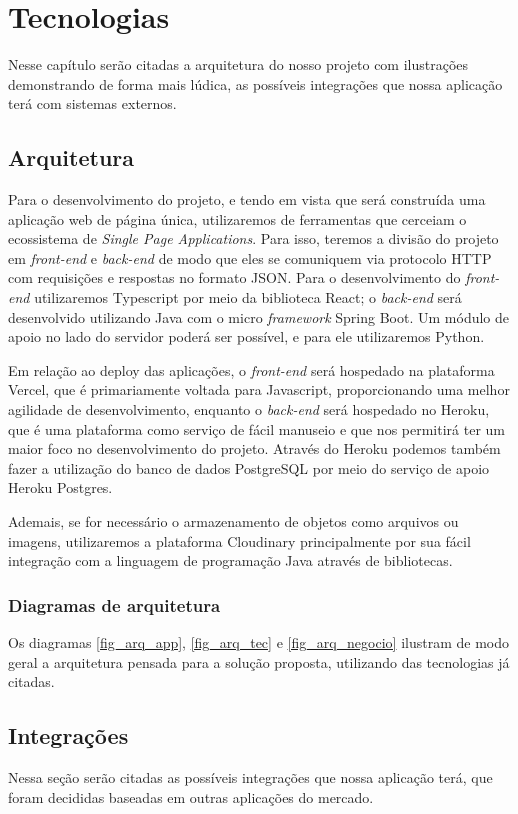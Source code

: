 \chapter{Tecnologias}
Nesse capítulo serão citadas a arquitetura do nosso projeto com ilustrações demonstrando de forma mais lúdica, as possíveis integrações que nossa aplicação terá com sistemas externos.

\section{Arquitetura}
Para o desenvolvimento do projeto, e tendo em vista que será construída uma aplicação web de página única, utilizaremos de ferramentas que cerceiam o ecossistema de \textit{Single Page Applications}. Para isso, teremos a divisão do projeto em \textit{front-end} e \textit{back-end} de modo que eles se comuniquem via protocolo HTTP com requisições e respostas no formato JSON. Para o desenvolvimento do \textit{front-end} utilizaremos Typescript por meio da biblioteca React; o \textit{back-end} será desenvolvido utilizando Java com o micro \textit{framework} Spring Boot. Um módulo de apoio no lado do servidor poderá ser possível, e para ele utilizaremos Python. 

Em relação ao deploy das aplicações, o \textit{front-end} será hospedado na plataforma Vercel, que é primariamente voltada para Javascript, proporcionando uma melhor agilidade de desenvolvimento, enquanto o \textit{back-end} será hospedado no Heroku, que é uma plataforma como serviço de fácil manuseio e que nos permitirá ter um maior foco no desenvolvimento do projeto. Através do Heroku podemos também fazer a utilização do banco de dados PostgreSQL por meio do serviço de apoio Heroku Postgres.

Ademais, se for necessário o armazenamento de objetos como arquivos ou imagens, utilizaremos a plataforma Cloudinary principalmente por sua fácil integração com a linguagem de programação Java através de bibliotecas.

%
\subsection{Diagramas de arquitetura}
Os diagramas \autoref{fig_arq_app}, \autoref{fig_arq_tec} e \autoref{fig_arq_negocio} ilustram de modo geral a arquitetura pensada para a solução proposta, utilizando das tecnologias já citadas.

\section{Integrações}
Nessa seção serão citadas as possíveis integrações que nossa aplicação terá, que foram decididas baseadas em outras aplicações do mercado.

